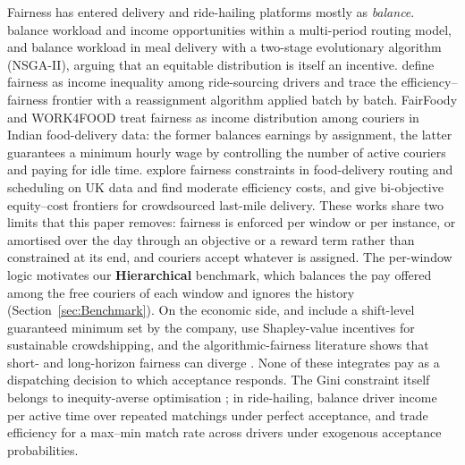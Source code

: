 \documentclass[a4paper,11pt,review,3p,authoryear]{elsarticle}
\begin{document}
Fairness has entered delivery and ride-hailing platforms mostly as \emph{balance}. \cite{wen2010dynamic} balance workload and income opportunities within a multi-period routing model, and \cite{liao2020multi} balance workload in meal delivery with a two-stage evolutionary algorithm (NSGA-II), arguing that an equitable distribution is itself an incentive. \cite{lesmana2019balancing} define fairness as income inequality among ride-sourcing drivers and trace the efficiency--fairness frontier with a reassignment algorithm applied batch by batch. FairFoody \citep{gupta2022fairfoody} and WORK4FOOD \citep{nair2022work4food} treat fairness as income distribution among couriers in Indian food-delivery data: the former balances earnings by assignment, the latter guarantees a minimum hourly wage by controlling the number of active couriers and paying for idle time. \cite{martinez2024exploring} explore fairness constraints in food-delivery routing and scheduling on UK data and find moderate efficiency costs, and \cite{sobhanan2026equity} give bi-objective equity--cost frontiers for crowdsourced last-mile delivery. These works share two limits that this paper removes: fairness is enforced per window or per instance, or amortised over the day through an objective or a reward term rather than constrained at its end, and couriers accept whatever is assigned. The per-window logic motivates our \textbf{Hierarchical} benchmark, which balances the pay offered among the free couriers of each window and ignores the history (Section~\ref{sec:Benchmark}). On the economic side, \cite{reyes2018meal} and \cite{yildiz2019provably} include a shift-level guaranteed minimum set by the company, \cite{bajec2022strategic} use Shapley-value incentives for sustainable crowdshipping, and the algorithmic-fairness literature shows that short- and long-horizon fairness can diverge \citep{corbettdavies2023measure}. None of these integrates pay as a dispatching decision to which acceptance responds. The Gini constraint itself belongs to inequity-averse optimisation \citep{karsu2015inequity,ogryczak2000inequality}; in ride-hailing, \cite{suhr2019twosided} balance driver income per active time over repeated matchings under perfect acceptance, and \cite{xu2020trade} trade efficiency for a max--min match rate across drivers under exogenous acceptance probabilities.
\end{document}
